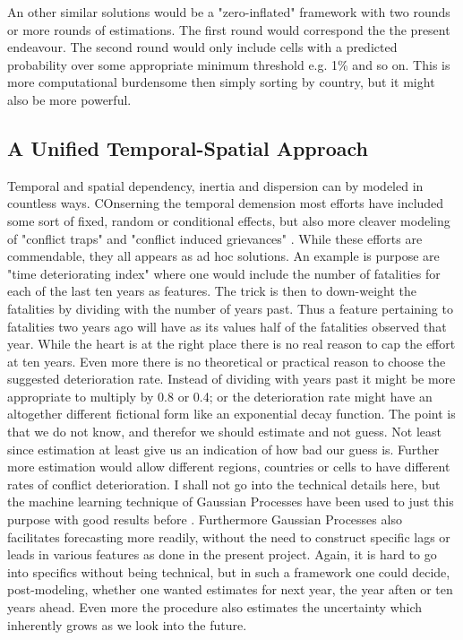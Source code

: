 \documentclass[a4paper]{article}
\begin{document}
An other similar solutions would be a "zero-inflated" framework with two rounds or more rounds of estimations. The first round would correspond the the present endeavour. The second round would only include cells with a predicted probability over some appropriate minimum threshold e.g. 1\% and so on. This is more computational burdensome then simply sorting by country, but it might also be more powerful.\par  

\subsection{A Unified Temporal-Spatial Approach}

Temporal and spatial dependency, inertia and dispersion can by modeled in countless ways. COnserning the temporal demension most efforts have included some sort of fixed, random or conditional effects, but also more cleaver modeling of "conflict traps" and "conflict induced grievances" \citep{Collier_Hoeffler_2004, Hegre_Sambanis_2006, Cederman_Gleditsch_Buhaug_2013, perry_2013}. While these efforts are commendable, they all appears as ad hoc solutions. An example is \cite{perry_2013} purpose are "time deteriorating index" where one would include the number of fatalities for each of the last ten years as features. The trick is then to down-weight the fatalities by dividing with the number of years past. Thus a feature pertaining to fatalities two years ago will have as its values half of the fatalities observed that year\cite[14]{perry_2013}. While the heart is at the right place there is no real reason to cap the effort at ten years. Even more there is no theoretical or practical reason to choose the suggested deterioration rate. Instead of dividing with years past it might be more appropriate to multiply by 0.8 or 0.4; or the deterioration rate might have an altogether different fictional form like an exponential decay function. The point is that we do not know, and therefor we should estimate and not guess. Not least since estimation at least give us an indication of how bad our guess is. Further more estimation would allow different regions, countries or cells to have different rates of conflict deterioration. I shall not go into the technical details here, but the machine learning technique of Gaussian Processes have been used to just this purpose with good results before \citep{Gelman_2013, Mcelreath_2018}. Furthermore Gaussian Processes also facilitates forecasting more readily, without the need to construct specific lags or leads in various features as done in the present project. Again, it is hard to go into specifics without being technical, but in such a framework one could decide, post-modeling, whether one wanted estimates for next year, the year aften or ten years ahead. Even more the procedure also estimates the uncertainty which inherently grows as we look into the future.\par
 
\end{document}
